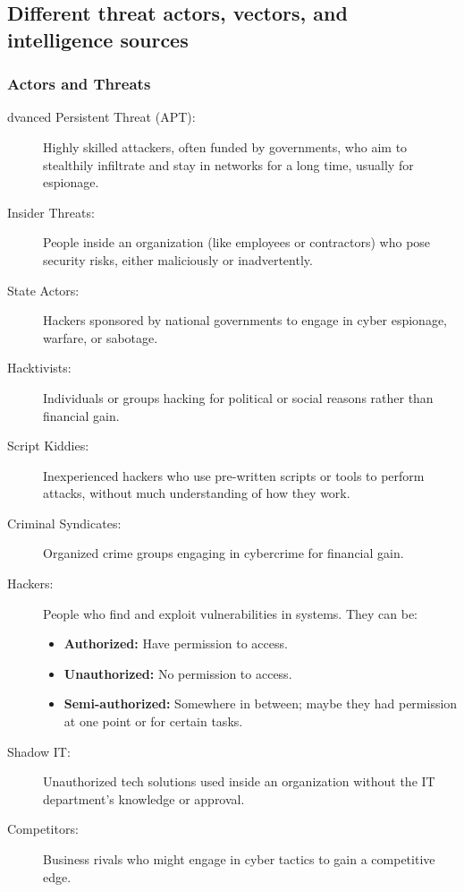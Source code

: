 \begin{fullwidth} 
    \subsection{Different threat actors, vectors, and intelligence sources}
    \subsubsection*{\color{red}Actors and Threats}
    \begin{description}
        \item[dvanced Persistent Threat (APT):] Highly skilled attackers, often funded by governments, who aim to stealthily infiltrate and stay in networks for a long time, usually for espionage.
        \item[Insider Threats:] People inside an organization (like employees or contractors) who pose security risks, either maliciously or inadvertently.
        \item[State Actors:] Hackers sponsored by national governments to engage in cyber espionage, warfare, or sabotage.
        \item[Hacktivists:] Individuals or groups hacking for political or social reasons rather than financial gain.
        \item[Script Kiddies:] Inexperienced hackers who use pre-written scripts or tools to perform attacks, without much understanding of how they work.
        \item[Criminal Syndicates:] Organized crime groups engaging in cybercrime for financial gain.
        \item[Hackers:] People who find and exploit vulnerabilities in systems. They can be:
        \begin{itemize}
            \item \textbf{Authorized:} Have permission to access.
            \item \textbf{Unauthorized:} No permission to access.
            \item \textbf{Semi-authorized:} Somewhere in between; maybe they had permission at one point or for certain tasks.
        \end{itemize}
        \item[Shadow IT:] Unauthorized tech solutions used inside an organization without the IT department’s knowledge or approval.
        \item[Competitors:] Business rivals who might engage in cyber tactics to gain a competitive edge.
    \end{description}


\end{fullwidth}

